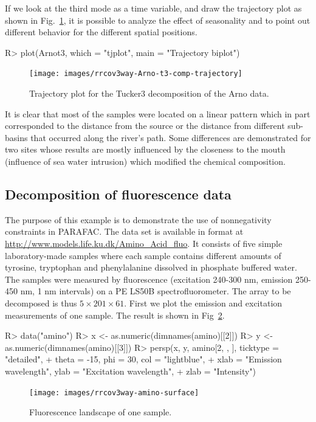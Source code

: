 \documentclass[article,shortnames, nojss]{jss}
\begin{document}
If we look at the third mode as a time variable, and draw the trajectory plot
as shown in Fig.~\ref{fig-Arno-t3-comp-trajectory}, it is possible to
analyze the effect of seasonality and to point out different behavior
for the different spatial positions.
\begin{Schunk}
\begin{Sinput}
R> plot(Arnot3, which = "tjplot", main = "Trajectory biplot")
\end{Sinput}
\end{Schunk}
\begin{figure}[H]
\centering
\texttt{[image: images/rrcov3way-Arno-t3-comp-trajectory]}
\caption{Trajectory plot for the Tucker3 decomposition of the Arno data.}
\label{fig-Arno-t3-comp-trajectory}
\end{figure}
It is clear that most of the samples were located on a linear pattern
which in part corresponded to the distance from the source or the distance from
different sub-basins that occurred along the river's path.
Some differences are demonstrated for two sites whose results
are mostly influenced by the closeness to the mouth (influence of
sea water intrusion) which modified the chemical composition.
\subsection{Decomposition of fluorescence data}
\label{sec:ex-amino}
The purpose of this example is to demonstrate the use of nonnegativity constraints in PARAFAC.
The data set \citep{bro:1997} is available in  format at \url{http://www.models.life.ku.dk/Amino_Acid_fluo}.
It consists of five simple laboratory-made samples where each sample contains
different amounts of tyrosine, tryptophan and phenylalanine dissolved in phosphate
buffered water. The samples were measured by fluorescence (excitation 240-300 nm,
emission 250-450 nm, 1 nm intervals) on a PE LS50B spectrofluorometer.
The array to be decomposed is thus $5 \times 201 \times 61$. First we plot
the emission and excitation measurements of one sample. The result is shown in Fig~\ref{fig-amino-surface}.
\begin{Schunk}
\begin{Sinput}
R> data("amino")
R> x <- as.numeric(dimnames(amino)[[2]])
R> y <- as.numeric(dimnames(amino)[[3]])
R> persp(x, y, amino[2, , ], ticktype = "detailed",
+      theta = -15, phi = 30, col = "lightblue",
+      xlab = "Emission wavelength", ylab = "Excitation wavelength",
+      zlab = "Intensity")
\end{Sinput}
\end{Schunk}
\begin{figure}[H]
\centering
\texttt{[image: images/rrcov3way-amino-surface]}
\caption{Fluorescence landscape of one sample.}
\label{fig-amino-surface}
\end{figure}
\end{document}

